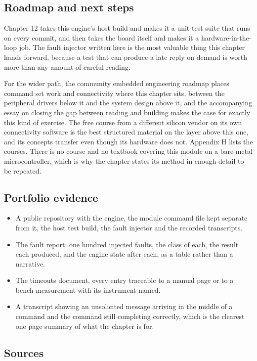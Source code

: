 \subsection*{Roadmap and next steps}

Chapter 12 takes this engine's host build and makes it a unit test suite that
runs on every commit, and then takes the board itself and makes it a
hardware-in-the-loop job. The fault injector written here is the most valuable
thing this chapter hands forward, because a test that can produce a late reply
on demand is worth more than any amount of careful reading.

For the wider path, the community embedded engineering roadmap places command
set work and connectivity where this chapter sits, between the peripheral
drivers below it and the system design above it, and the accompanying essay on
closing the gap between reading and building makes the case for exactly this
kind of exercise. The free course from a different silicon vendor on its own
connectivity software is the best structured material on the layer above this
one, and its concepts transfer even though its hardware does not. Appendix H
lists the courses. There is no course and no textbook covering this module on a
bare-metal microcontroller, which is why the chapter states its method in enough
detail to be repeated.

\subsection*{Portfolio evidence}

\begin{itemize}
\item A public repository with the engine, the module command file kept
separate from it, the host test build, the fault injector and the recorded
transcripts.
\item The fault report: one hundred injected faults, the class of each, the
result each produced, and the engine state after each, as a table rather than a
narrative.
\item The timeouts document, every entry traceable to a manual page or to a
bench measurement with its instrument named.
\item A transcript showing an unsolicited message arriving in the middle of a
command and the command still completing correctly, which is the clearest one
page summary of what the chapter is for.
\end{itemize}

\subsection*{Sources}

